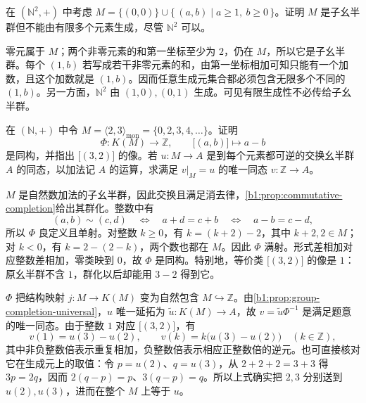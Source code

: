 \begin{exercise}\label{b1:ex:01-infinitely-generated-submonoid}
	在 \((\mathbb N^2,+)\) 中考虑 \(M=\bigl\{(0,0)\bigr\}\cup\bigl\{\,(a,b)\mid a\geq1,\ b\geq0\,\bigr\}\)。证明 \(M\) 是子幺半群但不能由有限多个元素生成，尽管 \(\mathbb N^2\) 可以。
\end{exercise}
\begin{solution}
	零元属于 \(M\)；两个非零元素的和第一坐标至少为 \(2\)，仍在 \(M\)，所以它是子幺半群。每个 \((1,b)\) 若写成若干非零元素的和，由第一坐标相加可知只能有一个加数，且这个加数就是 \((1,b)\)。因而任意生成元集合都必须包含无限多个不同的 \((1,b)\)。另一方面，\(\mathbb N^2\) 由 \((1,0),(0,1)\) 生成。可见有限生成性不必传给子幺半群。
\end{solution}

\begin{exercise}\label{b1:ex:01-generated-completion}
	在 \((\mathbb N,+)\) 中令 \(M=\langle2,3\rangle_{\mathrm{mon}}=\{0,2,3,4,\ldots\}\)。证明
	\[
		\Phi:K(M)\longrightarrow\mathbb Z,\qquad \bigl[(a,b)\bigr]\longmapsto a-b
	\]
	是同构，并指出 \(\bigl[(3,2)\bigr]\) 的像。若 \(u:M\rightarrow A\) 是到每个元素都可逆的交换幺半群 \(A\) 的同态，以加法记 \(A\) 的运算，求满足 \(v|_M=u\) 的唯一同态 \(v:\mathbb Z\rightarrow A\)。
\end{exercise}
\begin{solution}
	\(M\) 是自然数加法的子幺半群，因此交换且满足消去律，\cref{b1:prop:commutative-completion}给出其群化。整数中有
	\[
		(a,b)\sim(c,d) \quad\Longleftrightarrow\quad a+d=c+b \quad\Longleftrightarrow\quad a-b=c-d,
	\]
	所以 \(\Phi\) 良定义且单射。对整数 \(k\geq0\)，有 \(k=(k+2)-2\)，其中 \(k+2,2\in M\)；对 \(k<0\)，有 \(k=2-(2-k)\)，两个数也都在 \(M\)。因此 \(\Phi\) 满射。形式差相加对应整数差相加，零类映到 \(0\)，故 \(\Phi\) 是同构。特别地，等价类 \(\bigl[(3,2)\bigr]\) 的像是 \(1\)：原幺半群不含 \(1\)，群化以后却能用 \(3-2\) 得到它。

	\(\Phi\) 把结构映射 \(j:M\rightarrow K(M)\) 变为自然包含 \(M\hookrightarrow\mathbb Z\)。由\cref{b1:prop:group-completion-universal}，\(u\) 唯一延拓为 \(\widetilde u:K(M)\rightarrow A\)，故 \(v=\widetilde u\Phi^{-1}\) 是满足题意的唯一同态。由于整数 \(1\) 对应 \(\bigl[(3,2)\bigr]\)，有
	\[
		v(1)=u(3)-u(2),\qquad v(k)=k\bigl(u(3)-u(2)\bigr)\quad(k\in\mathbb Z),
	\]
	其中非负整数倍表示重复相加，负整数倍表示相应正整数倍的逆元。也可直接核对它在生成元上的取值：令 \(p=u(2)\)、\(q=u(3)\)，从 \(2+2+2=3+3\) 得 \(3p=2q\)，因而 \(2(q-p)=p\)、\(3(q-p)=q\)。所以上式确实把 \(2,3\) 分别送到 \(u(2),u(3)\)，进而在整个 \(M\) 上等于 \(u\)。
\end{solution}

